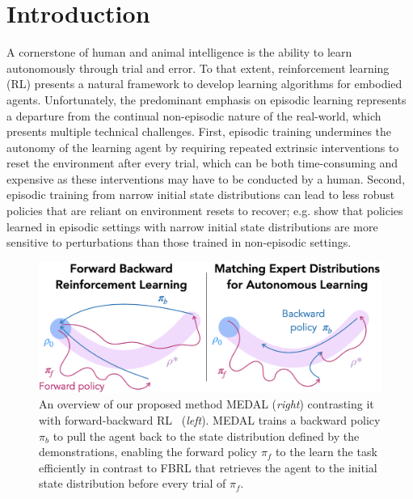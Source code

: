 \documentclass[nohyperref]{article}
\theoremstyle{plain}
\theoremstyle{definition}
\theoremstyle{remark}
\begin{document}
\section{Introduction}

A cornerstone of human and animal intelligence is the ability to learn autonomously through trial and error. To that extent, reinforcement learning (RL) presents a natural framework to develop learning algorithms for embodied agents. Unfortunately, the predominant emphasis on episodic learning represents a departure from the continual non-episodic nature of the real-world, which presents multiple technical challenges. First, episodic training undermines the autonomy of the learning agent by requiring repeated extrinsic interventions to reset the environment after every trial, which can be both time-consuming and expensive as these interventions may have to be conducted by a human. Second, episodic training from narrow initial state distributions can lead to less robust policies that are reliant on environment resets to recover; e.g. \citet{sharma2021autonomous} show that policies learned in episodic settings with narrow initial state distributions are more sensitive to perturbations than those trained in non-episodic settings.

\begin{figure}[t]
    \centering
    \includegraphics[width=1.0\columnwidth]{figures/medal.png}
    \caption{An overview of our proposed method MEDAL (\textit{right}) contrasting it with forward-backward RL~\citep{han2015learning,eysenbach2017leave} (\textit{left}). MEDAL trains a backward policy $\pi_b$ to pull the agent back to the state distribution defined by the demonstrations, enabling the forward policy $\pi_f$ to the learn the task efficiently in contrast to FBRL that retrieves the agent to the initial state distribution before every trial of $\pi_f$.}
    \label{fig:overview}
\end{figure}
\end{document}
